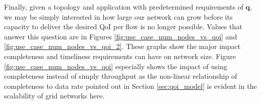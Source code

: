 Finally, given a topology and application with predetermined requirements of $\mathbf{q}$, we may be simply interested in how large our network can grow before its capacity to deliver the desired QoI per flow is no longer possible.  Values that answer this question are in Figures \ref{fig:use_case_num_nodes_vs_qoi} and \ref{fig:use_case_num_nodes_vs_qoi_2}.  These graphs show the major impact completeness and timeliness requirements can have on network size. Figure \ref{fig:use_case_num_nodes_vs_qoi} especially shows the impact of using completeness instead of simply throughput as the non-linear relationship of completeness to data rate pointed out in Section \ref{sec:qoi_model} is evident in the scalability of grid networks here.




